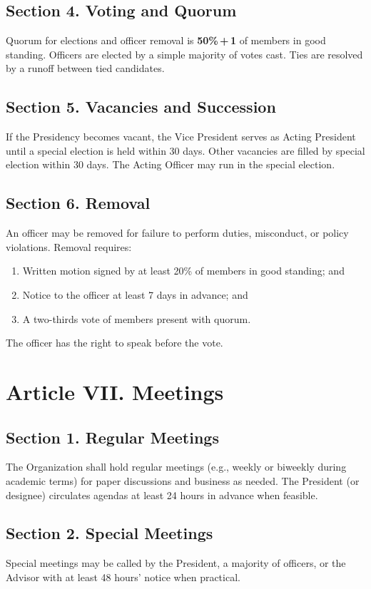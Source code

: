\documentclass[12pt]{article}
\newcommand{\quorum}{50\%\,+\,1}                 %
\begin{document}
\subsection*{Section 4. Voting and Quorum}
Quorum for elections and officer removal is \textbf{\quorum} of members in good standing. Officers are elected by a simple majority of votes cast. Ties are resolved by a runoff between tied candidates.

\subsection*{Section 5. Vacancies and Succession}
If the Presidency becomes vacant, the Vice President serves as Acting President until a special election is held within 30 days. Other vacancies are filled by special election within 30 days. The Acting Officer may run in the special election.

\subsection*{Section 6. Removal}
An officer may be removed for failure to perform duties, misconduct, or policy violations. Removal requires:
\begin{enumerate}[label=\alph*)]
    \item Written motion signed by at least 20\% of members in good standing; and
    \item Notice to the officer at least 7 days in advance; and
    \item A two-thirds vote of members present with quorum.
\end{enumerate}
The officer has the right to speak before the vote.

\section*{Article VII. Meetings}
\subsection*{Section 1. Regular Meetings}
The Organization shall hold regular meetings (e.g., weekly or biweekly during academic terms) for paper discussions and business as needed. The President (or designee) circulates agendas at least 24 hours in advance when feasible.

\subsection*{Section 2. Special Meetings}
Special meetings may be called by the President, a majority of officers, or the Advisor with at least 48 hours’ notice when practical.
\end{document}
